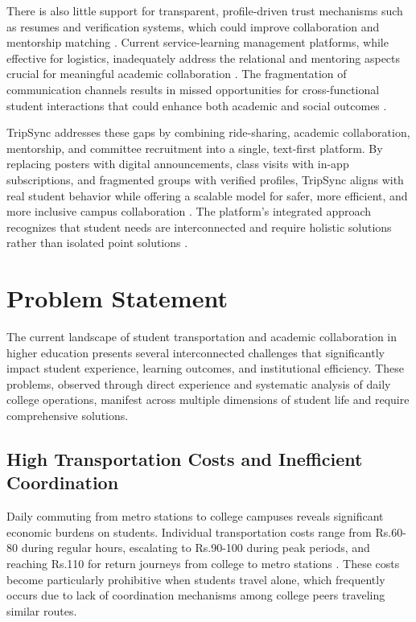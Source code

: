 \documentclass[conference]{IEEEtran}
\begin{document}
There is also little support for transparent, profile-driven trust mechanisms such as resumes and verification systems, which could improve collaboration and mentorship matching \cite{ref15}\cite{ref16}. Current service-learning management platforms, while effective for logistics, inadequately address the relational and mentoring aspects crucial for meaningful academic collaboration \cite{ref17}\cite{ref1}. The fragmentation of communication channels results in missed opportunities for cross-functional student interactions that could enhance both academic and social outcomes \cite{ref2}\cite{ref3}.

TripSync addresses these gaps by combining ride-sharing, academic collaboration, mentorship, and committee recruitment into a single, text-first platform. By replacing posters with digital announcements, class visits with in-app subscriptions, and fragmented groups with verified profiles, TripSync aligns with real student behavior while offering a scalable model for safer, more efficient, and more inclusive campus collaboration \cite{ref4}\cite{ref5}. The platform's integrated approach recognizes that student needs are interconnected and require holistic solutions rather than isolated point solutions \cite{ref6}\cite{ref7}.

\section{Problem Statement}

The current landscape of student transportation and academic collaboration in higher education presents several interconnected challenges that significantly impact student experience, learning outcomes, and institutional efficiency. These problems, observed through direct experience and systematic analysis of daily college operations, manifest across multiple dimensions of student life and require comprehensive solutions.

\subsection{High Transportation Costs and Inefficient Coordination}

Daily commuting from metro stations to college campuses reveals significant economic burdens on students. Individual transportation costs range from Rs.60-80 during regular hours, escalating to Rs.90-100 during peak periods, and reaching Rs.110 for return journeys from college to metro stations \cite{ref8}\cite{ref9}. These costs become particularly prohibitive when students travel alone, which frequently occurs due to lack of coordination mechanisms among college peers traveling similar routes.
\end{document}
